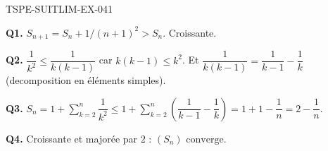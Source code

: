 \begin{corrige}{TSPE-SUITLIM-EX-041}

\textbf{Q1.} $S_{n+1} = S_n + 1/(n+1)^2 > S_n$. Croissante.

\textbf{Q2.} $\dfrac{1}{k^2} \leq \dfrac{1}{k(k-1)}$ car $k(k-1) \leq k^2$. Et $\dfrac{1}{k(k-1)} = \dfrac{1}{k-1}-\dfrac{1}{k}$ (decomposition en éléments simples).

\textbf{Q3.} $S_n = 1 + \sum_{k=2}^n \dfrac{1}{k^2} \leq 1 + \sum_{k=2}^n \left(\dfrac{1}{k-1}-\dfrac{1}{k}\right) = 1 + 1 - \dfrac{1}{n} = 2-\dfrac{1}{n}$.

\textbf{Q4.} Croissante et majorée par $2$ : $\boxed{(S_n) \text{ converge}}$.

\end{corrige}
